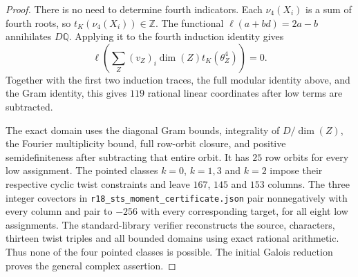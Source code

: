 \begin{proof}
There is no need to determine fourth indicators. Each $\nu_4(X_i)$
is a sum of fourth roots, so $t_K(\nu_4(X_i))\in\mathbb Z$.
The functional $\ell(a+bd)=2a-b$ annihilates $D\mathbb Q$.
Applying it to the fourth induction identity gives
\[
 \ell\!\left(\sum_Z(v_Z)_i\dim(Z)t_K(\theta_Z^4)\right)=0.
\]
Together with the first two induction traces, the full modular
identity above, and the Gram identity, this gives $119$ rational
linear coordinates after low terms are subtracted.

The exact domain uses the diagonal Gram bounds, integrality of
$D/\dim(Z)$, the Fourier multiplicity bound, full row-orbit
closure, and positive semidefiniteness after subtracting that
entire orbit. It has $25$ row orbits for every low assignment.
The pointed classes $k=0$, $k=1,3$ and $k=2$ impose their respective
cyclic twist constraints and leave $167$, $145$ and $153$ columns.
The three integer covectors in
\texttt{r18\_sts\_moment\_certificate.json} pair nonnegatively
with every column and pair to $-256$ with every corresponding
target, for all eight low assignments. The standard-library
verifier reconstructs the source, characters, thirteen twist
triples and all bounded domains using exact rational arithmetic.
Thus none of the four pointed classes is possible. The initial
Galois reduction proves the general complex assertion.
\end{proof}
